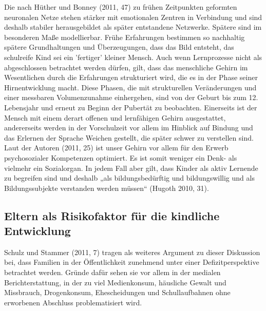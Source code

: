 Die nach Hüther und Bonney (2011, 47) zu frühen Zeitpunkten geformten neuronalen Netze stehen stärker mit emotionalen Zentren in Verbindung und sind deshalb stabiler herausgebildet als später entstandene Netzwerke. Spätere sind im besonderen Maße modellierbar.
Frühe Erfahrungen bestimmen so nachhaltig spätere Grundhaltungen und Überzeugungen, dass das Bild entsteht, das schulreife Kind sei ein ’fertiger' kleiner Mensch. Auch wenn Lernprozesse nicht als abgeschlossen betrachtet werden dürfen, gilt, dass das menschliche Gehirn im Wesentlichen durch die Erfahrungen strukturiert wird, die es in der Phase seiner Hirnentwicklung macht. 
Diese Phasen, die mit strukturellen Veränderungen und einer messbaren Volumenzunahme einhergehen, sind von der Geburt bis zum 12. Lebensjahr und erneut zu Beginn der Pubertät zu beobachten. 
Einerseits ist der Mensch mit einem derart offenen und lernfähigen Gehirn ausgestattet, andererseits werden in der Vorschulzeit vor allem im Hinblick auf Bindung und das Erlernen der Sprache Weichen gestellt, die später schwer zu verstellen sind. Laut der Autoren  (2011, 25) ist unser Gehirn vor allem für den Erwerb psychosozialer Kompetenzen optimiert. Es ist somit weniger ein Denk- als vielmehr ein Sozialorgan.  
In jedem Fall aber gilt, dass Kinder als aktiv Lernende zu begreifen sind und deshalb „als bildungsbedürftig und bildungswillig und als Bildungssubjekte verstanden werden müssen“ (Hugoth 2010, 31).
 
\subsection{Eltern als Risikofaktor für die kindliche Entwicklung}\label{sec:Risikofaktoren}
Schulz und Stammer (2011, 7) tragen als weiteres Argument zu dieser Diskussion bei, dass Familien in der Öffentlichkeit zunehmend unter einer Defizitperspektive betrachtet werden. Gründe dafür sehen sie vor allem in der medialen Berichterstattung, in der zu viel Medienkonsum, häusliche Gewalt und Missbrauch, Drogenkonsum, Ehescheidungen und  Schullaufbahnen ohne erworbenen Abschluss problematisiert wird. 

